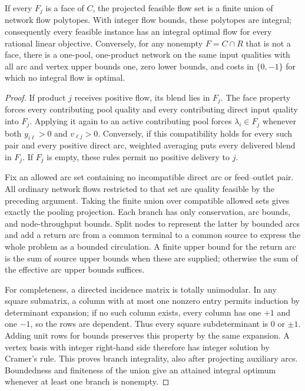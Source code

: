 \begin{theorem}\label{s1:facial}
If every $F_j$ is a face of $C$, the projected feasible flow set is a
finite union of network flow polytopes. With integer flow bounds, these
polytopes are integral; consequently every feasible instance has an
integral optimal flow for every rational linear objective.
Conversely, for any nonempty $F=C\cap R$ that is not a face, there is
a one-pool, one-product network on the same input qualities with all
arc and vertex upper bounds one, zero lower bounds, and costs in
$\{0,-1\}$ for which no integral flow is optimal.
\end{theorem}
\begin{proof}
If product $j$ receives positive flow, its blend lies in $F_j$.
The face property forces every contributing pool quality and every
contributing direct input quality into $F_j$. Applying it again to
an active contributing pool forces $\lambda_i\in F_j$ whenever both
$y_{i\ell}>0$ and $v_{\ell j}>0$. Conversely, if this compatibility
holds for every such pair and every positive direct arc, weighted
averaging puts every delivered blend in $F_j$. If $F_j$ is empty,
these rules permit no positive delivery to $j$.

Fix an allowed arc set containing no incompatible direct arc or feed--outlet
pair. All ordinary network flows restricted to that set are quality
feasible by the preceding argument. Taking the finite union over
compatible allowed sets gives exactly the pooling projection. Each
branch has only conservation, arc bounds, and node-throughput bounds.
Split nodes to represent the latter by bounded arcs and add a return
arc from a common terminal to a common source to express the whole
problem as a bounded circulation. A finite upper bound for the return
arc is the sum of source upper bounds when these are supplied; otherwise
the sum of the effective arc upper bounds suffices.

For completeness, a directed incidence matrix is totally unimodular.
In any square submatrix, a column with at most one nonzero entry permits
induction by determinant expansion; if no such column exists, every
column has one $+1$ and one $-1$, so the rows are dependent. Thus every
square subdeterminant is $0$ or $\pm1$. Adding unit rows for bounds
preserves this property by the same expansion. A vertex basis with
integer right-hand side therefore has integer solution by Cramer's rule.
This proves branch integrality, also after projecting auxiliary arcs.
Boundedness and finiteness of the union give an attained integral optimum
whenever at least one branch is nonempty.


\end{proof}
